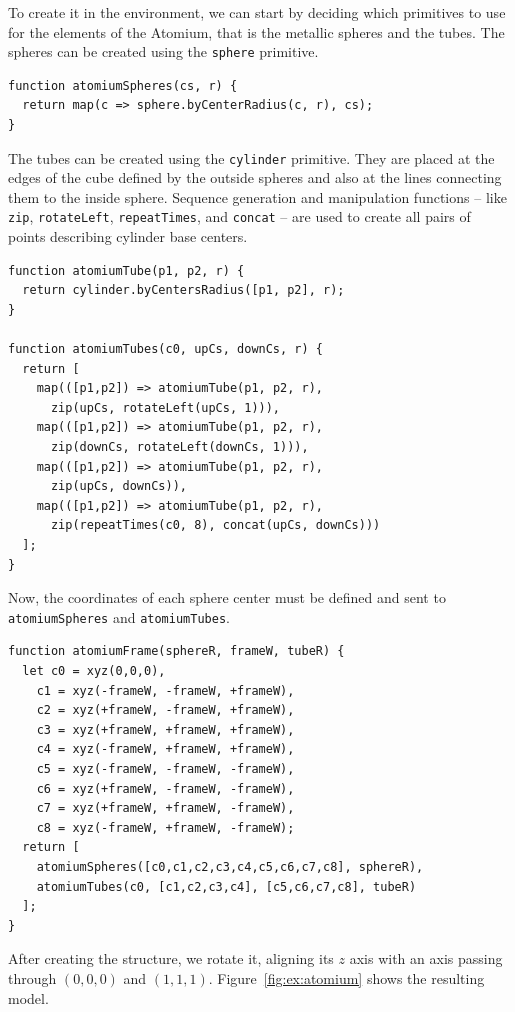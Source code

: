 To create it in the environment, we can start by deciding which primitives to use for the elements of the Atomium, that is the metallic spheres and the tubes.
The spheres can be created using the {\tt sphere} primitive.

\begin{verbatim}
function atomiumSpheres(cs, r) {
  return map(c => sphere.byCenterRadius(c, r), cs);
}
\end{verbatim}

The tubes can be created using the {\tt cylinder} primitive.
They are placed at the edges of the cube defined by the outside spheres and also at the lines connecting them to the inside sphere.
Sequence generation and manipulation functions -- like {\tt zip}, {\tt rotateLeft}, {\tt repeatTimes}, and {\tt concat} -- are used to create all pairs of points describing cylinder base centers.

\begin{verbatim}
function atomiumTube(p1, p2, r) {
  return cylinder.byCentersRadius([p1, p2], r);
}

function atomiumTubes(c0, upCs, downCs, r) {
  return [
    map(([p1,p2]) => atomiumTube(p1, p2, r),
      zip(upCs, rotateLeft(upCs, 1))),
    map(([p1,p2]) => atomiumTube(p1, p2, r),
      zip(downCs, rotateLeft(downCs, 1))),
    map(([p1,p2]) => atomiumTube(p1, p2, r),
      zip(upCs, downCs)),
    map(([p1,p2]) => atomiumTube(p1, p2, r),
      zip(repeatTimes(c0, 8), concat(upCs, downCs)))
  ];
}
\end{verbatim}

Now, the coordinates of each sphere center must be defined and sent to {\tt atomiumSpheres} and {\tt atomiumTubes}.

\begin{verbatim}
function atomiumFrame(sphereR, frameW, tubeR) {
  let c0 = xyz(0,0,0),
    c1 = xyz(-frameW, -frameW, +frameW),
    c2 = xyz(+frameW, -frameW, +frameW),
    c3 = xyz(+frameW, +frameW, +frameW),
    c4 = xyz(-frameW, +frameW, +frameW),
    c5 = xyz(-frameW, -frameW, -frameW),
    c6 = xyz(+frameW, -frameW, -frameW),
    c7 = xyz(+frameW, +frameW, -frameW),
    c8 = xyz(-frameW, +frameW, -frameW);
  return [
    atomiumSpheres([c0,c1,c2,c3,c4,c5,c6,c7,c8], sphereR),
    atomiumTubes(c0, [c1,c2,c3,c4], [c5,c6,c7,c8], tubeR)
  ];
}
\end{verbatim}

After creating the structure, we rotate it, aligning its $z$ axis with an axis passing through $(0,0,0)$ and $(1,1,1)$.
Figure~\ref{fig:ex:atomium} shows the resulting model.

